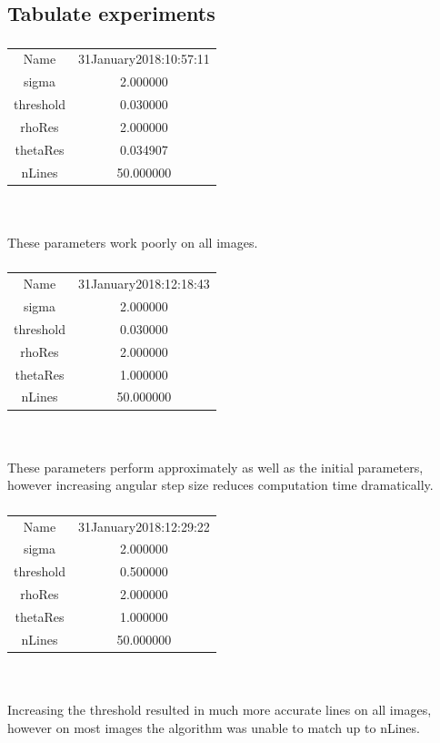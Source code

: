 \documentclass[12pt]{article}
\begin{document}
\newpage
\subsection{Tabulate experiments}

\subsubsection{}
\begin{tabular} { c c }
Name  &  31January2018:10:57:11 \\
sigma  &  2.000000 \\
threshold  &  0.030000 \\
rhoRes & 2.000000 \\
thetaRes & 0.034907 \\
nLines & 50.000000 
\end{tabular}
\\ \\
These parameters work poorly on all images.

\subsubsection{}
\begin{tabular} { c c }
Name & 31January2018:12:18:43\\
sigma & 2.000000\\
threshold & 0.030000\\
rhoRes & 2.000000\\
thetaRes & 1.000000\\
nLines & 50.000000
\end{tabular}
\\ \\
These parameters perform approximately as well as the initial parameters, however increasing angular step size reduces computation time dramatically.

\subsubsection{}
\begin{tabular} { c c }
Name & 31January2018:12:29:22\\
sigma & 2.000000\\
threshold & 0.500000\\
rhoRes & 2.000000\\
thetaRes & 1.000000\\
nLines & 50.000000
\end{tabular}
\\ \\
Increasing the threshold resulted in much more accurate lines on all images, however on most images the algorithm was unable to match up to nLines.
\end{document}
